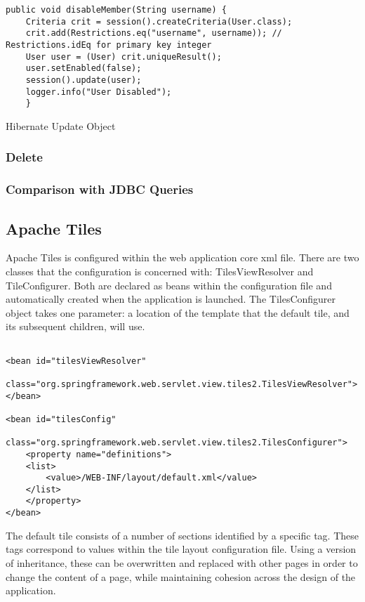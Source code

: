\begin{table}[H]
\begin{lstlisting}
public void disableMember(String username) {
	Criteria crit = session().createCriteria(User.class);
	crit.add(Restrictions.eq("username", username)); // Restrictions.idEq for primary key integer
	User user = (User) crit.uniqueResult();
	user.setEnabled(false);
	session().update(user);
	logger.info("User Disabled");
	}
\end{lstlisting}
\caption{Hibernate Update Object }
\end{table}

\subsubsection{Delete}

\subsubsection{Comparison with JDBC Queries}

\subsection{Apache Tiles}

Apache Tiles is configured within the web application core xml file. There are two classes that the configuration is concerned with: TilesViewResolver and TileConfigurer. Both are declared as beans within the configuration file and automatically created when the application is launched. The TilesConfigurer object takes one parameter: a location of the template that the default tile, and its subsequent children, will use. \newline

\begin{lstlisting}

<bean id="tilesViewResolver"
	class="org.springframework.web.servlet.view.tiles2.TilesViewResolver">
</bean>

<bean id="tilesConfig"
	class="org.springframework.web.servlet.view.tiles2.TilesConfigurer">
	<property name="definitions">
	<list>
		<value>/WEB-INF/layout/default.xml</value>
	</list>
	</property>
</bean>
\end{lstlisting}

The default tile consists of a number of sections identified by a specific tag. These tags correspond to values within the tile layout configuration file. Using a version of inheritance, these can be overwritten and replaced with other pages in order to change the content of a page, while maintaining cohesion across the design of the application. 

